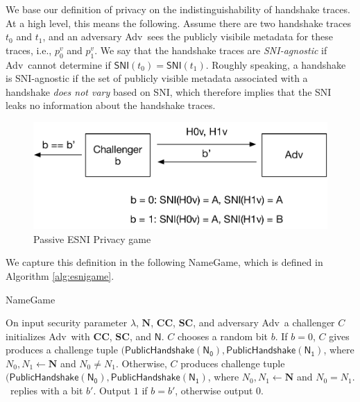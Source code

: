 \documentclass{article}
\newcommand{\adv}{{\sf Adv}}
\begin{document}
We base our definition of privacy on the indistinguishability of handshake traces. At a high level, 
this means the following. Assume there are two handshake traces $t_0$ and $t_1$, and an adversary \adv\
sees the publicly visibile metadata for these traces, i.e., $p_0^v$ and $p_1^v$. We say that the 
handshake traces are \emph{SNI-agnostic} if \adv\ cannot determine if $\mathsf{SNI}(t_0) = \mathsf{SNI}(t_1)$.
Roughly speaking, a handshake is SNI-agnostic if the set of publicly visible metadata 
associated with a handshake \emph{does not vary} based on SNI, which therefore 
implies that the SNI leaks no information about the handshake traces.

\begin{figure}
    \centering
    \includegraphics[scale=0.7]{esni_game_passive.pdf}
    \caption{Passive ESNI Privacy game}
    \label{fig:passive-game}
\end{figure}

We capture this definition in the following {\sf NameGame}, which is defined in Algorithm \ref{alg:esnigame}.

\begin{algorithm}
\caption{{\sf NameGame}} 
\label{alg:esnigame}
\begin{algorithmic}[1]
  \STATE On input security parameter $\lambda$, $\mathbf{N}$, $\mathbf{CC}$, $\mathbf{SC}$, and adversary \adv\, a challenger $C$ initializes \adv\ with $\mathbf{CC}$, $\mathbf{SC}$, 
  and $\mathsf{N}$. 
  \STATE $C$ chooses a random bit $b$. If $b = 0$, $C$ gives produces a challenge tuple
  $(\mathsf{PublicHandshake(N_0)}, \mathsf{PublicHandshake(N_1)}$, where 
  $N_0,N_1 \gets \mathbf{N}$ and $N_0 \not= N_1$.
  Otherwise, $C$ produces challenge tuple 
  $(\mathsf{PublicHandshake(N_0)}, \mathsf{PublicHandshake(N_1)}$, where 
  $N_0,N_1 \gets \mathbf{N}$ and $N_0 = N_1$.
  \STATE \adv\ replies with a bit $b'$.
  \STATE Output $1$ if $b = b'$, otherwise output $0$.
\end{algorithmic}
\end{algorithm}
\end{document}
